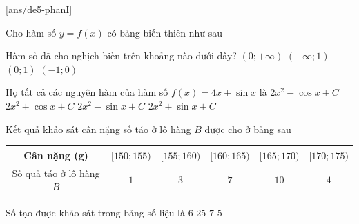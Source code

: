 \begin{name}
	{\tenchude}
	{\tendethi}
	{\tentruong}
	{\thoigian}
	\end{name}
\TN
{}[ans/de5-phanI]
\begin{ex}%
	Cho hàm số $y=f(x)$ có bảng biến thiên như sau
	\begin{center}
	\end{center}
	Hàm số đã cho nghịch biến trên khoảng nào dưới đây?
	\choice
	{$(0;+\infty)$}
	{$(-\infty;1)$}
	{\True $(0;1)$}
	{$(-1;0)$}
\end{ex}
\begin{ex}%
	Họ tất cả các nguyên hàm của hàm số $f(x)=4x+\sin x$ là
	\choice
	{\True $2x^2-\cos x+C$}
	{$2x^2+\cos x+C$}
	{$2x^2-\sin x+C$}
	{$2x^2+\sin x+C$}
\end{ex}
\begin{ex}%
	Kết quả khảo sát cân nặng số táo ở lô hàng $B$ được cho ở bảng sau
	\begin{center}
		\begin{tabular}{|c|c|c|c|c|c|}
			\hline
			Cân nặng (g) & $[150;155)$ & $[155;160)$ & $[160;165)$ & $[165;170)$ & $[170;175)$ \\
			\hline
			Số quả táo ở lô hàng $B$ & $1$ & $3$ & $7$ & $10$ & $4$ \\
			\hline
		\end{tabular}
	\end{center}
	Số tạo được khảo sát trong bảng số liệu là
	\choice
	{$6$}
	{\True $25$}
	{$7$}
	{$5$}
\end{ex}
